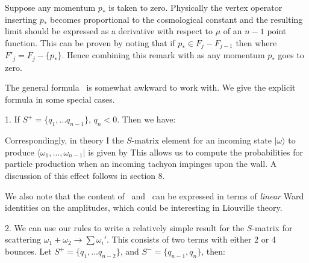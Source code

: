  
Suppose any momentum $p_*$ is taken to zero. Physically the vertex operator
inserting $p_*$ becomes proportional to the cosmological constant and the 
resulting limit should be expressed as a derivative with respect to $\mu$ of
an $n-1$ point function. This can be proven by noting that if 
$p_*\in F_j- F_{j-1}$ then  
\eqn{}
where $F'_j=F_j-\{ p_*\}$. Hence combining this remark with \radmisi
\eqn{}
as any momentum $p_*$ goes to zero. 
 
 
 
The general formula \fltfrm\ is somewhat awkward to work with. We give the
explicit formula in some special cases.
 
 
1. If $S^+=\{q_1,\dots q_{n-1}\}$, $q_n<0$. Then we have:
\eqn{}
 
Correspondingly, in theory I the $S$-matrix element for an
incoming state $|\omega\rangle$ to produce
$\langle \omega_1,\dots,\omega_{n-1}|$
is given by
\eqn{}
This allows us to compute the probabilities for particle production when an
incoming tachyon impinges upon the wall. A discussion of this effect follows in
section 8.
 
We also note that the content of \oton\ and \prtprd\ can be expressed 
in terms of {\it linear} Ward identities on the amplitudes, 
which could be interesting in Liouville theory.
 
2. We can use our rules to write a relatively
simple result for the $S$-matrix for scattering
$\omega_1+\omega_2\to \sum \omega_i'$. This consists of two terms
with either 2 or 4 bounces.
Let $S^+ = \{ q_1,\ldots q_{n-2}\}$, and $S^- = \{ q_{n-1},q_n\}$, then: 
\eqn{}
 
